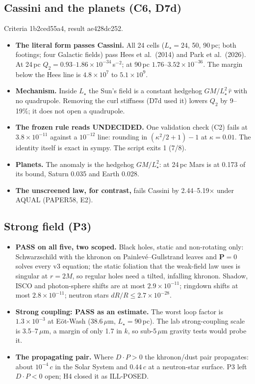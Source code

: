 \documentclass[10pt]{article}
\begin{document}
\subsection{Cassini and the planets (C6, D7d)}
Criteria 1b2ced55a4, result ae428dc252.
\begin{itemize}
\item \textbf{The literal form passes Cassini.} All 24 cells ($L_\star=24$, 50, 90\,pc; both footings; four Galactic fields) pass Hees et al.\ (2014) and Park et al.\ (2026). At 24\,pc $Q_2=0.93$--$1.86\times10^{-34}$\,s$^{-2}$; at 90\,pc $1.76$--$3.52\times10^{-36}$. The margin below the Hees line is $4.8\times10^{7}$ to $5.1\times10^{9}$.
\item \textbf{Mechanism.} Inside $L_\star$ the Sun's field is a constant hedgehog $GM/L_\star^2\,\hat r$ with no quadrupole. Removing the curl stiffness (D7d used it) lowers $Q_2$ by 9--19\%; it does not open a quadrupole.
\item \textbf{The frozen rule reads UNDECIDED.} One validation check (C2) fails at $3.8\times10^{-11}$ against a $10^{-12}$ line: rounding in $(\kappa^2/2+1)-1$ at $\kappa=0.01$. The identity itself is exact in sympy. The script exits 1 (7/8).
\item \textbf{Planets.} The anomaly is the hedgehog $GM/L_\star^2$: at 24\,pc Mars is at 0.173 of its bound, Saturn 0.035 and Earth 0.028.
\item \textbf{The unscreened law, for contrast,} fails Cassini by 2.44--5.19$\times$ under AQUAL (PAPER58, E2).
\end{itemize}

\subsection{Strong field (P3)}\label{sec:strong}
\begin{itemize}
\item \textbf{PASS on all five, two scoped.} Black holes, static and non-rotating only: Schwarzschild with the khronon on Painlev\'e--Gullstrand leaves and $\mathbf P=0$ solves every v3 equation; the static foliation that the weak-field law uses is singular at $r=2M$, so regular holes need a tilted, infalling khronon. Shadow, ISCO and photon-sphere shifts are at most $2.9\times10^{-11}$; ringdown shifts at most $2.8\times10^{-11}$; neutron stars $dR/R\le2.7\times10^{-28}$.
\item \textbf{Strong coupling: PASS as an estimate.} The worst loop factor is $1.3\times10^{-3}$ at E\"ot-Wash (38.6\,$\mu$m, $L_\star=90$\,pc). The lab strong-coupling scale is 3.5--7\,$\mu$m, a margin of only 1.7 in $k$, so sub-5\,$\mu$m gravity tests would probe it.
\item \textbf{The propagating pair.} Where $D\cdot P>0$ the khronon/dust pair propagates: about $10^{-4}\,c$ in the Solar System and $0.44\,c$ at a neutron-star surface. P3 left $D\cdot P<0$ open; H4 closed it as ILL-POSED.
\end{itemize}
\end{document}
